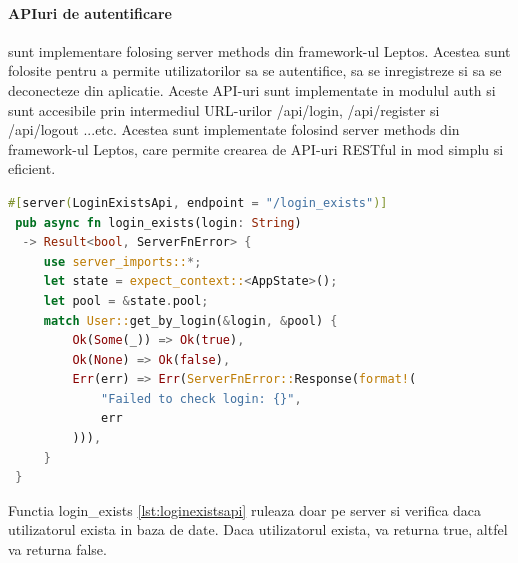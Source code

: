 \documentclass[titlepage,12pt]{article}
\DeclareRobustCommand{\code}[1]{{\ttfamily\small #1}}
\begin{document}
\paragraph{API\-uri de autentificare} sunt implementare folosing server methods din framework-ul Leptos. Acestea sunt folosite pentru a permite utilizatorilor sa se autentifice, sa se inregistreze si sa se deconecteze din aplicatie. Aceste API-uri sunt implementate in modulul \code{auth} si sunt accesibile prin intermediul URL-urilor \code{/api/login}, \code{/api/register} si \code{/api/logout} ...etc. Acestea sunt implementate folosind server methods din framework-ul Leptos, care permite crearea de API-uri RESTful in mod simplu si eficient.

\begin{lstlisting}[language=Rust,caption={API pentru verificarea existentei utilizatorului},label={lst:loginexistsapi}]
 #[server(LoginExistsApi, endpoint = "/login_exists")]
 pub async fn login_exists(login: String)
  -> Result<bool, ServerFnError> {
     use server_imports::*;
     let state = expect_context::<AppState>();
     let pool = &state.pool;
     match User::get_by_login(&login, &pool) {
         Ok(Some(_)) => Ok(true),
         Ok(None) => Ok(false),
         Err(err) => Err(ServerFnError::Response(format!(
             "Failed to check login: {}",
             err
         ))),
     }
 }
 \end{lstlisting}
 Functia \code{login\_exists} \cref{lst:loginexistsapi} ruleaza doar pe server si verifica daca utilizatorul exista in baza de date. Daca utilizatorul exista, va returna \code{true}, altfel va returna \code{false}.
\end{document}
